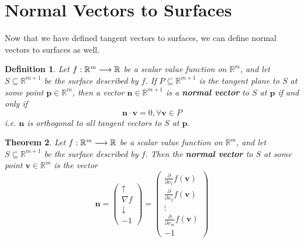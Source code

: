 \documentclass[12pt]{book}
\newcommand{\rbb}{\mathbb{R}}
\theoremstyle{definitionstyle}
\newtheorem{definition}{Definition}[section]
\newtheorem{theorem}[definition]{Theorem}
\numberwithin{equation}{section}
\begin{document}
\vspace{0.5cm}

\section{Normal Vectors to Surfaces}

Now that we have defined tangent vectors to surfaces, we can define normal vectors to surfaces as well.

\begin{definition}
    Let $\func{f}{\rbb^m}{\rbb}$ be a scalar value function on $\rbb^m$, and let $S \subseteq \rbb^{m+1}$ be the surface described by $f$. If $P \subseteq \rbb^{m+1}$ is the tangent plane to $S$ at some point $\mathbf{p} \in \rbb^m$, then a vector $\mathbf{n} \in \rbb^{m+1}$ is a \textbf{normal vector} to $S$ at $\mathbf{p}$ if and only if
    \begin{equation}
	\mathbf{n} \cdot \mathbf{v} = 0, \forall \mathbf{v} \in P
    \end{equation}
    i.e. $\mathbf{n}$ is orthogonal to all tangent vectors to $S$ at $\mathbf{p}$.
\end{definition}

\vspace{0.5cm}

\begin{theorem}\label{normal-vector-scalar-value-function}
    Let $\func{f}{\rbb^m}{\rbb}$ be a scalar value function on $\rbb^m$, and let $S \subseteq \rbb^{m+1}$ be the surface described by $f$. Then the \textbf{normal vector} to $S$ at some point $\mathbf{v} \in \rbb^m$ is the vector
    \begin{equation}
	\mathbf{n} = \begin{pmatrix} \uparrow \\ \nabla f \\ \downarrow \\ -1 \end{pmatrix} = \begin{pmatrix} \frac{\partial}{\partial v_1}f(\mathbf{v}) \\[6pt] \frac{\partial}{\partial v_2}f(\mathbf{v}) \\ \vdots \\ \frac{\partial}{\partial v_m}f(\mathbf{v}) \\ -1 \end{pmatrix}
    \end{equation}
\end{theorem}

\vspace{0.5cm}
\end{document}
